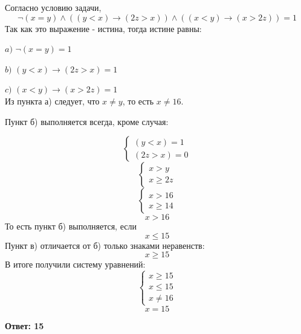 \documentclass[a4paper,14pt]{article} %
\begin{document}
Согласно условию задачи,
\[ \neg{(x=y)} \land((y<x) \to (2z>x)) \land((x<y) \to (x>2z)) =1\]
Так как это выражение - истина, тогда истине равны:

$a)$ $\neg{(x=y)}=1$ 

$b)$ $(y<x) \to (2z>x)=1$

$c)$ $(x<y) \to (x>2z)=1$ \\

Из пункта а) следует, что $x \neq y$, то есть $x \neq 16$.

Пункт б) выполняется всегда, кроме случая:

\[\begin{cases}
  (y < x) = 1\\
  (2z>x)=0
\end{cases}\] 
\[\begin{cases}
  x>y\\
  x\geqslant 2z
\end{cases}\]
 \[\begin{cases}
  x>16\\
  x\geqslant 14
\end{cases}\]
\[ x>16\]
То есть пункт б) выполняется, если
\[ x\leqslant15\]
Пункт в) отличается от б) только знаками неравенств:
\[ x\geqslant15\]
В итоге получили систему уравнений:
\[\begin{cases}
  x\geqslant15\\
  x\leqslant15\\
  x \neq 16
\end{cases}\]
\[x = 15\]
\begin{flushright}
\begin{large}
\textbf {Ответ: 15}
\end{large}
\end{flushright}

\newpage
\end{document}
